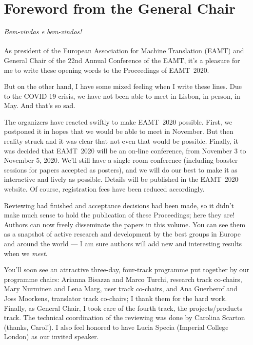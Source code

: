 \documentclass[a4paper,11pt,twoside]{book}
\newcommand{\newoddpage} {\clearpage
  \ifthenelse{\isodd{\value{page}}}{}
  {\thispagestyle{empty}\quad\newpage}}
\begin{document}
\newoddpage
\frontmatter

\tableofcontents

\chapter*{Foreword from the General Chair}

\noindent
\emph{Bem-vindas e bem-vindos!}\\
\\

As president of the European Association for Machine Translation (EAMT) and General Chair of the 22nd Annual Conference of the EAMT, it's a pleasure for me to write these opening words to the Proceedings of EAMT~2020.

But on the other hand, I have some mixed feeling when I write these lines. Due to the COVID-19 crisis, we have not been able to meet in Lisbon, in person, in May. And that's so sad.

The organizers have reacted swiftly to make EAMT~2020 possible. First, we postponed it in hopes that we would be able to meet in November. But then reality struck and it was clear that not even that would be possible. Finally, it was decided that EAMT~2020 will be an on-line conference, from November 3 to November 5, 2020. We'll still have a single-room conference  (including boaster sessions for papers accepted as posters), and we will do our best to make it as interactive and lively as possible. Details will be published in the EAMT~2020 website. Of course, registration fees have been reduced accordingly.

Reviewing had finished and acceptance decisions had been made, so it didn't make much sense to hold the publication of these Proceedings; here they are! Authors can now freely disseminate the papers in this volume. You can see them as a snapshot of active research and development by the best groups in Europe and around the world --- I am sure authors will add new and interesting results when we \emph{meet}.

You'll soon see an attractive three-day, four-track programme put together by our programme chairs: Arianna Bisazza and Marco Turchi, research track co-chairs, Mary Nurminen and Lena Marg, user track co-chairs, and Ana Guerberof and Joss Moorkens, translator track co-chairs; I thank them for the hard work. Finally, as General Chair, I took care of the fourth track, the projects/products track. The technical coordination of the reviewing was done by Carolina Scarton (thanks, Carol!).  I also feel honored to have Lucia Specia (Imperial College London) as our invited speaker.
\end{document}
